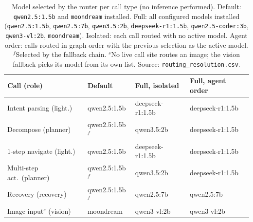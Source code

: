 \begin{table}[t]
\centering
\caption{Model selected by the router per call type (no inference performed). Default: \texttt{qwen2.5:1.5b} and \texttt{moondream} installed. Full: all configured models installed (\texttt{qwen2.5:1.5b}, \texttt{qwen2.5:7b}, \texttt{qwen3.5:2b}, \texttt{deepseek-r1:1.5b}, \texttt{qwen2.5-coder:3b}, \texttt{qwen3-vl:2b}, \texttt{moondream}). Isolated: each call routed with no active model. Agent order: calls routed in graph order with the previous selection as the active model. $^{f}$Selected by the fallback chain. $^{s}$No live call site routes an image; the vision fallback picks its model from its own list. Source: \texttt{routing\_resolution.csv}.}
\label{tab:route}
\footnotesize
\setlength{\tabcolsep}{1.5pt}
\begin{tabular}{@{}llll@{}}
\toprule
Call (role) & Default & Full, isolated & Full, agent order \\
\midrule
Intent parsing (light.) & qwen2.5:1.5b & deepseek-r1:1.5b & deepseek-r1:1.5b \\
Decompose (planner) & qwen2.5:1.5b$^{f}$ & qwen3.5:2b & deepseek-r1:1.5b \\
1-step navigate (light.) & qwen2.5:1.5b & deepseek-r1:1.5b & deepseek-r1:1.5b \\
Multi-step act.\ (planner) & qwen2.5:1.5b$^{f}$ & qwen3.5:2b & deepseek-r1:1.5b \\
Recovery (recovery) & qwen2.5:1.5b$^{f}$ & qwen2.5:7b & qwen2.5:7b \\
Image input$^{s}$ (vision) & moondream & qwen3-vl:2b & qwen3-vl:2b \\
\bottomrule
\end{tabular}
\end{table}
